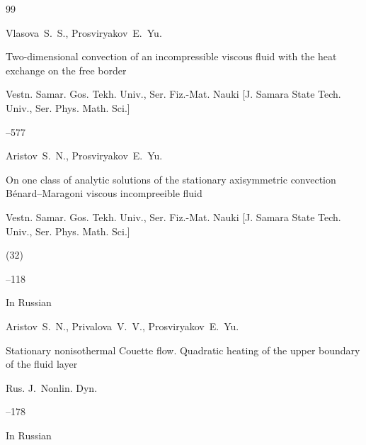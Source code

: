\begin{thebibliography}{99}




\by Vlasova~S.~S., Prosviryakov~E.~Yu.

\paper  Two-dimensional convection of an incompressible  viscous fluid with the heat exchange on the free border

\jour Vestn. Samar. Gos. Tekh. Univ.,  Ser. Fiz.-Mat. Nauki \rm [J. Samara State Tech. Univ., Ser. Phys. Math. Sci.]




–577







\by Aristov~S.~N., Prosviryakov~E.~Yu.

\paper On one class of analytic solutions of the stationary  axisymmetric convection B\'enard–Maragoni viscous incompreeible fluid

\jour Vestn. Samar. Gos. Tekh. Univ., Ser. Fiz.-Mat. Nauki \rm [J. Samara State Tech. Univ., Ser. Phys. Math. Sci.]


(32)

--118

\lang In Russian 





\by Aristov~S.~N., Privalova~V.~V., Prosviryakov~E.~Yu.

\paper Stationary nonisothermal Couette flow. Quadratic heating of the upper boundary of the fluid layer

\jour Rus. J.~Nonlin. Dyn.




--178

\lang In Russian 







\end{thebibliography}
